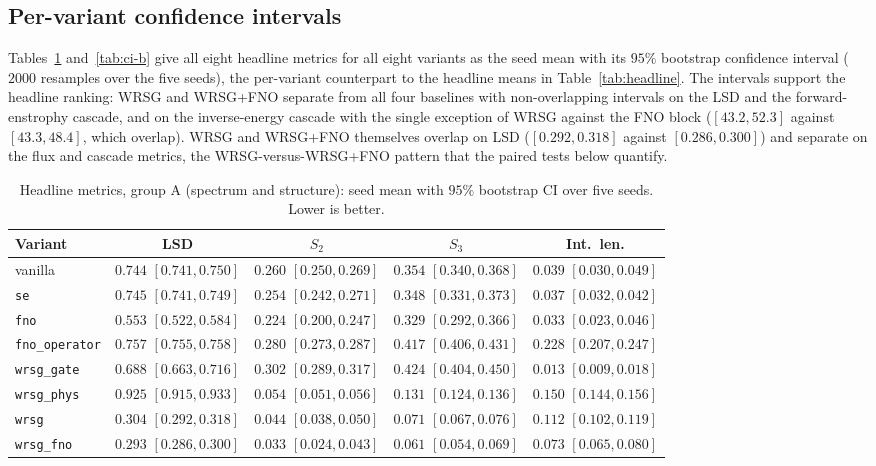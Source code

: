 \documentclass[10pt]{article} %
\begin{document}
\subsection{Per-variant confidence intervals}
\label{app:ci}

Tables~\ref{tab:ci-a} and~\ref{tab:ci-b} give all eight headline metrics for all eight variants as the seed mean with its $95\%$ bootstrap confidence interval ($2000$ resamples over the five seeds), the per-variant counterpart to the headline means in Table~\ref{tab:headline}. The intervals support the headline ranking: WRSG and WRSG+FNO separate from all four baselines with non-overlapping intervals on the LSD and the forward-enstrophy cascade, and on the inverse-energy cascade with the single exception of WRSG against the FNO block ($[43.2, 52.3]$ against $[43.3, 48.4]$, which overlap). WRSG and WRSG+FNO themselves overlap on LSD ($[0.292, 0.318]$ against $[0.286, 0.300]$) and separate on the flux and cascade metrics, the WRSG-versus-WRSG+FNO pattern that the paired tests below quantify.

\begin{table}[H]
\centering
\caption{Headline metrics, group A (spectrum and structure): seed mean with $95\%$ bootstrap CI over five seeds. Lower is better.}
\label{tab:ci-a}
\setlength{\tabcolsep}{4pt}
\begin{tabular}{lcccc}
\toprule
Variant & LSD & $S_2$ & $S_3$ & Int.\ len. \\
\midrule
vanilla & $0.744$ {\scriptsize$[0.741,0.750]$} & $0.260$ {\scriptsize$[0.250,0.269]$} & $0.354$ {\scriptsize$[0.340,0.368]$} & $0.039$ {\scriptsize$[0.030,0.049]$} \\
\texttt{se} & $0.745$ {\scriptsize$[0.741,0.749]$} & $0.254$ {\scriptsize$[0.242,0.271]$} & $0.348$ {\scriptsize$[0.331,0.373]$} & $0.037$ {\scriptsize$[0.032,0.042]$} \\
\texttt{fno} & $0.553$ {\scriptsize$[0.522,0.584]$} & $0.224$ {\scriptsize$[0.200,0.247]$} & $0.329$ {\scriptsize$[0.292,0.366]$} & $0.033$ {\scriptsize$[0.023,0.046]$} \\
\texttt{fno\_operator} & $0.757$ {\scriptsize$[0.755,0.758]$} & $0.280$ {\scriptsize$[0.273,0.287]$} & $0.417$ {\scriptsize$[0.406,0.431]$} & $0.228$ {\scriptsize$[0.207,0.247]$} \\
\texttt{wrsg\_gate} & $0.688$ {\scriptsize$[0.663,0.716]$} & $0.302$ {\scriptsize$[0.289,0.317]$} & $0.424$ {\scriptsize$[0.404,0.450]$} & $0.013$ {\scriptsize$[0.009,0.018]$} \\
\texttt{wrsg\_phys} & $0.925$ {\scriptsize$[0.915,0.933]$} & $0.054$ {\scriptsize$[0.051,0.056]$} & $0.131$ {\scriptsize$[0.124,0.136]$} & $0.150$ {\scriptsize$[0.144,0.156]$} \\
\texttt{wrsg} & $0.304$ {\scriptsize$[0.292,0.318]$} & $0.044$ {\scriptsize$[0.038,0.050]$} & $0.071$ {\scriptsize$[0.067,0.076]$} & $0.112$ {\scriptsize$[0.102,0.119]$} \\
\texttt{wrsg\_fno} & $0.293$ {\scriptsize$[0.286,0.300]$} & $0.033$ {\scriptsize$[0.024,0.043]$} & $0.061$ {\scriptsize$[0.054,0.069]$} & $0.073$ {\scriptsize$[0.065,0.080]$} \\
\bottomrule
\end{tabular}
\end{table}
\end{document}
